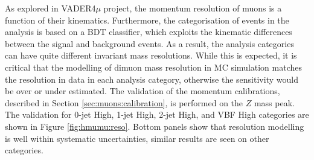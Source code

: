 As explored in VADER4$\mu$ project, the momentum resolution of muons
is a function of their kinematics. Furthermore, the categorisation of
events in the analysis is based on a BDT classifier, which exploits
the kinematic differences between the signal and background events.
As a result, the analysis categories can have quite different
invariant mass resolutions. While this is expected, it is critical
that the modelling of dimuon mass resolution in MC simulation matches
the resolution in data in each analysis category, otherwise the
sensitivity would be over or under estimated. The validation of
the momentum calibrations, described in Section \ref{sec:muons:calibration},
is performed on the $Z$ mass peak. The validation for 0-jet High,
1-jet High, 2-jet High, and VBF High categories are shown in
Figure \ref{fig:hmumu:reso}. Bottom panels show that resolution
modelling is well within systematic uncertainties, similar results are
seen on other categories.
